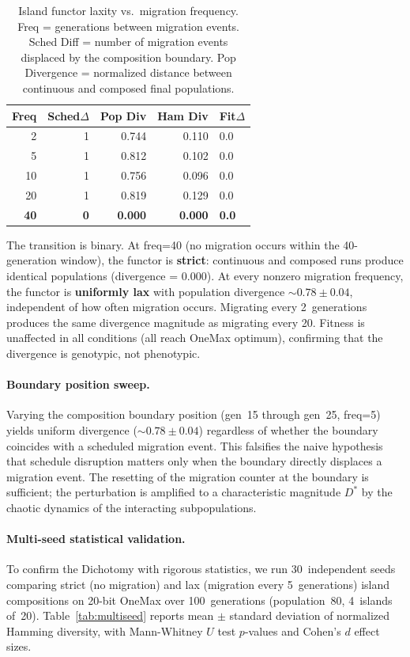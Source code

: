 \documentclass[sigconf,anonymous]{acmart}
\begin{document}
\begin{table}[ht]
\centering
\caption{Island functor laxity vs.\ migration frequency. Freq = generations between migration events. Sched Diff = number of migration events displaced by the composition boundary. Pop Divergence = normalized distance between continuous and composed final populations.}
\label{tab:laxity}
\small
\begin{tabular}{@{}rrrrl@{}}
\toprule
\textbf{Freq} & \textbf{Sched$\Delta$} & \textbf{Pop Div} & \textbf{Ham Div} & \textbf{Fit$\Delta$} \\
\midrule
2  & 1 & 0.744          & 0.110 & 0.0 \\
5  & 1 & 0.812          & 0.102 & 0.0 \\
10 & 1 & 0.756          & 0.096 & 0.0 \\
20 & 1 & 0.819          & 0.129 & 0.0 \\
\textbf{40} & \textbf{0} & \textbf{0.000} & \textbf{0.000} & \textbf{0.0} \\
\bottomrule
\end{tabular}
\end{table}

The transition is binary. At freq=40 (no migration occurs within the 40-generation window), the functor is \textbf{strict}: continuous and composed runs produce identical populations (divergence = 0.000). At every nonzero migration frequency, the functor is \textbf{uniformly lax} with population divergence ${\sim}0.78 \pm 0.04$, independent of how often migration occurs. Migrating every 2~generations produces the same divergence magnitude as migrating every 20. Fitness is unaffected in all conditions (all reach OneMax optimum), confirming that the divergence is genotypic, not phenotypic.

\paragraph{Boundary position sweep.}
Varying the composition boundary position (gen~15 through gen~25, freq=5) yields uniform divergence (${\sim}0.78 \pm 0.04$) regardless of whether the boundary coincides with a scheduled migration event. This falsifies the naive hypothesis that schedule disruption matters only when the boundary directly displaces a migration event. The resetting of the migration counter at the boundary is sufficient; the perturbation is amplified to a characteristic magnitude $D^*$ by the chaotic dynamics of the interacting subpopulations.

\paragraph{Multi-seed statistical validation.}
To confirm the Dichotomy with rigorous statistics, we run 30~independent seeds comparing strict (no migration) and lax (migration every 5~generations) island compositions on 20-bit OneMax over 100~generations (population~80, 4~islands of~20). Table~\ref{tab:multiseed} reports mean $\pm$ standard deviation of normalized Hamming diversity, with Mann-Whitney $U$ test $p$-values and Cohen's $d$ effect sizes.
\end{document}
